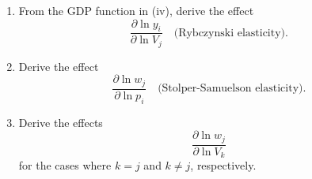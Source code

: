 \begin{tcolorbox}[breakable]
\begin{enumerate}
\item[(v)] From the GDP function in (iv), derive the effect
\[
\frac{\partial \ln y_i}{\partial \ln V_j}
\quad \text{(Rybczynski elasticity)}.
\]

\item[(vi)] Derive the effect
\[
\frac{\partial \ln w_j}{\partial \ln p_i}
\quad \text{(Stolper-Samuelson elasticity)}.
\]

\item[(vii)] Derive the effects
\[
\frac{\partial \ln w_j}{\partial \ln V_k}
\]
for the cases where \(k = j\) and \(k \neq j\), respectively.
\end{enumerate}

\end{tcolorbox}

